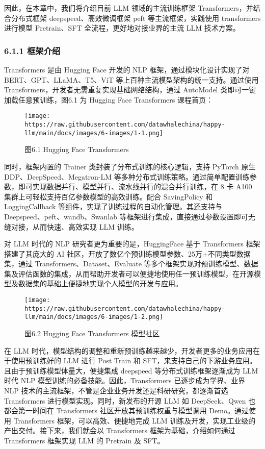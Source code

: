 \documentclass[12pt,a4paper]{book}
\begin{document}
因此，在本章中，我们将介绍目前 LLM 领域的主流训练框架
Transformers，并结合分布式框架 deepspeed、高效微调框架 peft
等主流框架，实践使用 transformers 进行模型 Pretrain、SFT
全流程，更好地对接业界的主流 LLM 技术方案。

\subsubsection{6.1.1 框架介绍}\label{ux6846ux67b6ux4ecbux7ecd}

Transformers 是由 Hugging Face 开发的 NLP 框架，通过模块化设计实现了对
BERT、GPT、LLaMA、T5、ViT 等上百种主流模型架构的统一支持。通过使用
Transformers，开发者无需重复实现基础网络结构，通过 AutoModel
类即可一键加载任意预训练，图6.1 为 Hugging Face Transformers 课程首页：

\begin{figure}[htbp]\centering
\texttt{[image: https://raw.githubusercontent.com/datawhalechina/happy-llm/main/docs/images/6-images/1-1.png]}
\caption{图6.1 Hugging Face Transformers}
\end{figure}

同时，框架内置的 Trainer 类封装了分布式训练的核心逻辑，支持 PyTorch 原生
DDP、DeepSpeed、Megatron-LM
等多种分布式训练策略。通过简单配置训练参数，即可实现数据并行、模型并行、流水线并行的混合并行训练，在
8 卡 A100 集群上可轻松支持百亿参数模型的高效训练。配合 SavingPolicy 和
LoggingCallback 等组件，实现了训练过程的自动化管理。其还支持与
Deepspeed、peft、wandb、Swanlab
等框架进行集成，直接通过参数设置即可无缝对接，从而快速、高效实现 LLM
训练。

对 LLM 时代的 NLP 研究者更为重要的是，HuggingFace 基于 Transformers
框架搭建了其庞大的 AI
社区，开放了数亿个预训练模型参数、25万+不同类型数据集，通过
Transformers、Dataset、Evaluate
等多个框架实现对预训练模型、数据集及评估函数的集成，从而帮助开发者可以便捷地使用任一预训练模型，在开源模型及数据集的基础上便捷地实现个人模型的开发与应用。

\begin{figure}[htbp]\centering
\texttt{[image: https://raw.githubusercontent.com/datawhalechina/happy-llm/main/docs/images/6-images/1-2.png]}
\caption{图6.2 Hugging Face Transformers 模型社区}
\end{figure}

在 LLM
时代，模型结构的调整和重新预训练越来越少，开发者更多的业务应用在于使用预训练好的
LLM 进行 Post Train 和
SFT，来支持自己的下游业务应用。且由于预训练模型体量大，便捷集成
deepspeed 等分布式训练框架逐渐成为 LLM 时代 NLP
模型训练的必备技能。因此，Transformers 已逐步成为学界、业界 NLP
技术的主流框架，不管是企业业务开发还是科研研究，都逐渐首选 Transformers
进行模型实现。同时，新发布的开源 LLM 如 DeepSeek、Qwen 也都会第一时间在
Transformers 社区开放其预训练权重与模型调用 Demo。通过使用 Transformers
框架，可以高效、便捷地完成 LLM
训练及开发，实现工业级的产出交付。接下来，我们就会以 Transformers
框架为基础，介绍如何通过 Transformers 框架实现 LLM 的 Pretrain 及 SFT。
\end{document}
